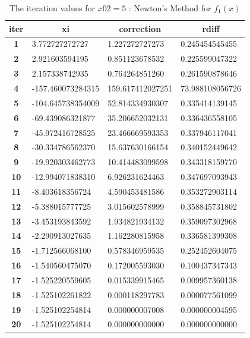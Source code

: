 \documentclass[a4paper, 12pt]{report}
\begin{document}
\begin{table}[h]
\centering
\begin{tabular}{|c|l|l|l|}
\hline
\textbf{iter} & \multicolumn{1}{c|}{\textbf{xi}} & \multicolumn{1}{c|}{\textbf{correction}} & \multicolumn{1}{c|}{\textbf{rdiff}} \\ \hline
\textbf{1}  & 3.772727272727    & 1.227272727273   & 0.245454545455  \\ \hline
\textbf{2}  & 2.921603594195    & 0.851123678532   & 0.225599047322  \\ \hline
\textbf{3}  & 2.157338742935    & 0.764264851260   & 0.261590878646  \\ \hline
\textbf{4}  & -157.460073284315 & 159.617412027251 & 73.988108056726 \\ \hline
\textbf{5}  & -104.645738354009 & 52.814334930307  & 0.335414139145  \\ \hline
\textbf{6}  & -69.439086321877  & 35.206652032131  & 0.336436558105  \\ \hline
\textbf{7}  & -45.972416728525  & 23.466669593353  & 0.337946117041  \\ \hline
\textbf{8}  & -30.334786562370  & 15.637630166154  & 0.340152449642  \\ \hline
\textbf{9}  & -19.920303462773  & 10.414483099598  & 0.343318159770  \\ \hline
\textbf{10} & -12.994071838310  & 6.926231624463   & 0.347697093943  \\ \hline
\textbf{11} & -8.403618356724   & 4.590453481586   & 0.353272903114  \\ \hline
\textbf{12} & -5.388015777725   & 3.015602578999   & 0.358845731802  \\ \hline
\textbf{13} & -3.453193843592   & 1.934821934132   & 0.359097302968  \\ \hline
\textbf{14} & -2.290913027635   & 1.162280815958   & 0.336581399308  \\ \hline
\textbf{15} & -1.712566068100   & 0.578346959535   & 0.252452604075  \\ \hline
\textbf{16} & -1.540560475070   & 0.172005593030   & 0.100437347343  \\ \hline
\textbf{17} & -1.525220559605   & 0.015339915465   & 0.009957360138  \\ \hline
\textbf{18} & -1.525102261822   & 0.000118297783   & 0.000077561099  \\ \hline
\textbf{19} & -1.525102254814   & 0.000000007008   & 0.000000004595  \\ \hline
\textbf{20} & -1.525102254814   & 0.000000000000   & 0.000000000000  \\ \hline
\end{tabular}
\caption{The iteration values for $x02 = 5$ : Newton's Method for $f_{1}(x)$}
\label{table:6}
\end{table}
\end{document}
